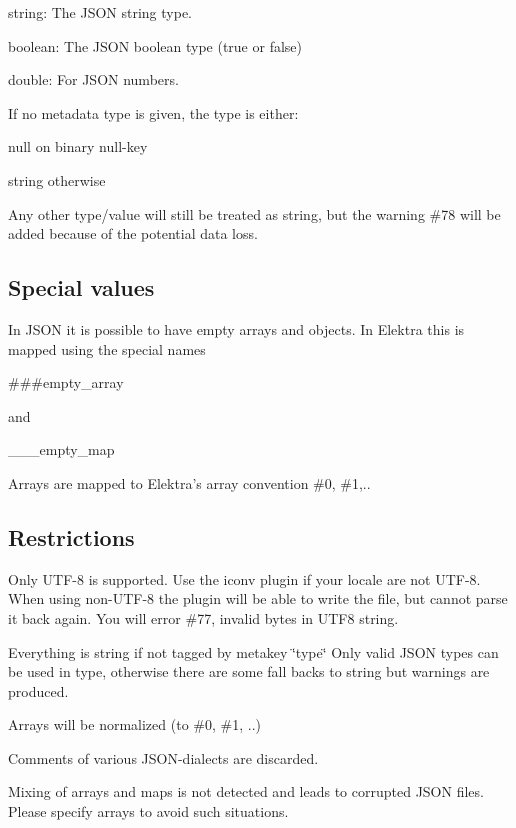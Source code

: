 \begin{DoxyItemize}
\item {\ttfamily string}\+: The J\+S\+ON string type.
\item {\ttfamily boolean}\+: The J\+S\+ON boolean type (true or false)
\item {\ttfamily double}\+: For J\+S\+ON numbers.
\end{DoxyItemize}

If no metadata {\ttfamily type} is given, the type is either\+:


\begin{DoxyItemize}
\item {\ttfamily null} on binary null-\/key
\item {\ttfamily string} otherwise
\end{DoxyItemize}

Any other type/value will still be treated as string, but the warning {\ttfamily \#78} will be added because of the potential data loss.

\subsection*{Special values}

In J\+S\+ON it is possible to have empty arrays and objects. In Elektra this is mapped using the special names \begin{DoxyVerb}###empty_array
\end{DoxyVerb}


and \begin{DoxyVerb}___empty_map
\end{DoxyVerb}


Arrays are mapped to Elektra’s array convention \#0, \#1,..

\subsection*{Restrictions}


\begin{DoxyItemize}
\item Only U\+T\+F-\/8 is supported. Use the {\ttfamily iconv} plugin if your locale are not U\+T\+F-\/8. When using non-\/\+U\+T\+F-\/8 the plugin will be able to write the file, but cannot parse it back again. You will error \#77, invalid bytes in U\+T\+F8 string.
\item Everything is string if not tagged by metakey \char`\"{}type\char`\"{} Only valid J\+S\+ON types can be used in type, otherwise there are some fall backs to string but warnings are produced.
\item Arrays will be normalized (to \#0, \#1, ..)
\item Comments of various J\+S\+O\+N-\/dialects are discarded.
\item Mixing of arrays and maps is not detected and leads to corrupted J\+S\+ON files. Please specify arrays to avoid such situations.
\end{DoxyItemize}


